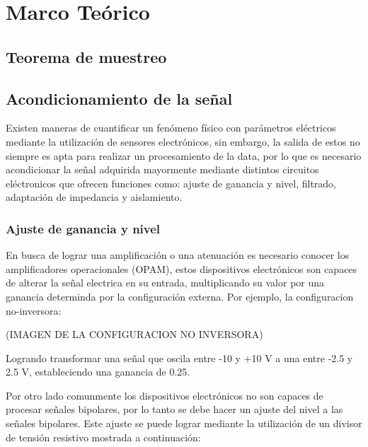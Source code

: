 \chapter{Marco Teórico}\label{sec:Marco_Teorico}
\thispagestyle{empty}

\begingroup
{}
\small

\endgroup

\section{Teorema de muestreo}

\section{Acondicionamiento de la señal}
\par Existen maneras de cuantificar un fenómeno físico con parámetros eléctricos
mediante la utilización de sensores electrónicos, sin embargo, la salida de estos
no siempre es apta para realizar un procesamiento de la data, por lo que es necesario
acondicionar la señal adquirida mayormente mediante distintos circuitos eléctronicos
que ofrecen funciones como: ajuste de ganancia y nivel, filtrado, adaptación de impedancia
y aislamiento.

\subsection{Ajuste de ganancia y nivel}
\par En busca de lograr una amplificación o una atenuación es necesario conocer
los amplificadores operacionales (OPAM), estos dispositivos electrónicos son capaces
de alterar la señal electrica en su entrada, multiplicando su valor por una ganancia
determinda por la configuración externa. Por ejemplo, la configuracion no-inversora:

(IMAGEN DE LA CONFIGURACION NO INVERSORA)

\par Logrando transformar una señal que oscila entre -10 y +10 V a una entre -2.5 y 2.5 V, estableciendo una ganancia de 0.25.

\par Por otro lado comunmente los dispositivos electrónicos no son capaces de procesar
señales bipolares, por lo tanto se debe hacer un ajuste del nivel a las señales bipolares.
Este ajuste se puede lograr mediante la utilización de un divisor de tensión resistivo
mostrada a continuación:

